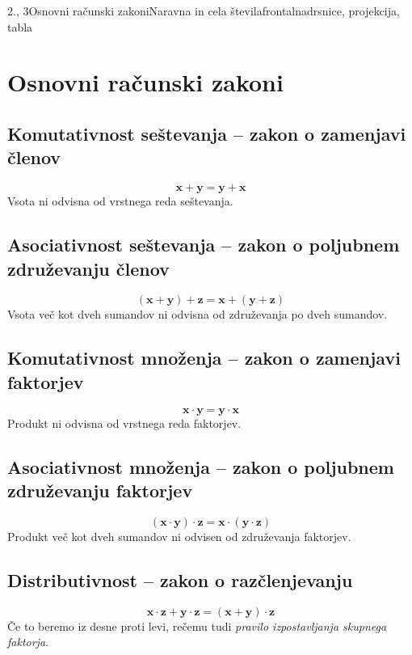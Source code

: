 \begin{priprava}{2., 3}{}{Osnovni računski zakoni}{Naravna in cela števila}{frontalna}{drsnice, projekcija, tabla}


    \section{Osnovni računski zakoni}

    \subsection*{Komutativnost seštevanja -- zakon o zamenjavi členov}
       $$ \mathbf{x+y=y+x}$$
       Vsota ni odvisna od vrstnega reda seštevanja.
    

       \subsection*{Asociativnost seštevanja -- zakon o poljubnem združevanju členov}
       $$ \mathbf{(x+y)+z=x+(y+z)}$$
       Vsota več kot dveh sumandov ni odvisna od združevanja po dveh sumandov.
    

       \subsection*{Komutativnost množenja -- zakon o zamenjavi faktorjev}
       $$ \mathbf{x\cdot y=y\cdot x}$$
       Produkt ni odvisna od vrstnega reda faktorjev.
    

       \subsection*{Asociativnost množenja -- zakon o poljubnem združevanju faktorjev}
       $$ \mathbf{(x\cdot y)\cdot z=x\cdot (y\cdot z)}$$
       Produkt več kot dveh sumandov ni odvisen od združevanja faktorjev.
    
       \subsection*{Distributivnost -- zakon o razčlenjevanju}
       $$ \mathbf{x\cdot z+y\cdot z = (x+y)\cdot z} $$
       Če to beremo iz desne proti levi, rečemu tudi \textit{pravilo izpostavljanja skupnega faktorja}.
       \newline ~
       \newline



\end{priprava}

